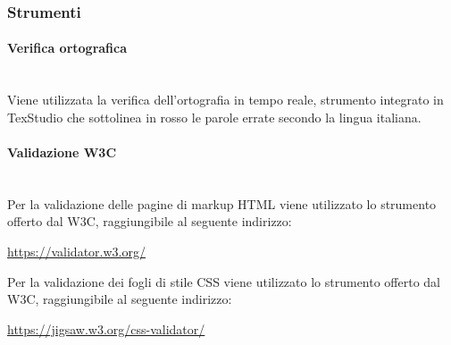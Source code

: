 		\subsubsection{Strumenti}
			\paragraph{Verifica ortografica} \mbox{}\\
			Viene utilizzata la verifica dell’ortografia in tempo reale, strumento integrato in TexStudio che sottolinea in rosso le parole errate secondo la lingua italiana.
			\paragraph{Validazione W3C} \mbox{}\\
			Per la validazione delle pagine di markup HTML viene utilizzato lo strumento offerto dal W3C, raggiungibile al seguente indirizzo: \newline
			\centerline{\url{https://validator.w3.org/}} \newline
			Per la validazione dei fogli di stile CSS viene utilizzato lo strumento offerto dal W3C, raggiungibile al seguente indirizzo: \newline
			\centerline{\url{https://jigsaw.w3.org/css-validator/}} \newline
	
